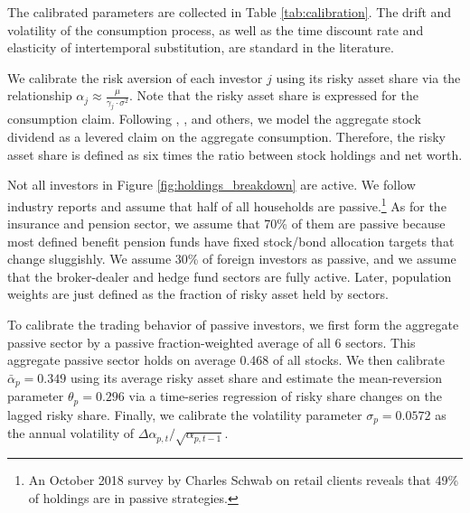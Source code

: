 \documentclass[12pt,english]{article}
\begin{document}
The calibrated parameters are collected in Table \ref{tab:calibration}. The drift and volatility of the consumption process, as well as the time discount rate and elasticity of intertemporal substitution, are standard in the literature. 

We calibrate the risk aversion of each investor $j$ using its risky asset share via the relationship $\alpha_j \approx \frac{\mu}{\gamma_j \cdot \sigma^2}$. Note that the risky asset share is expressed for the consumption claim. Following \citet{abel1999risk}, \citet{campbell2003consumption}, and others, we model the aggregate stock dividend as a levered claim on the aggregate consumption. Therefore, the risky asset share is defined as six times the ratio between stock holdings and net worth. 

Not all investors in Figure \ref{fig:holdings_breakdown} are active. We follow industry reports and assume that half of all households are passive.\footnote{An October 2018 survey by Charles Schwab on retail clients reveals that 49\% of holdings are in passive strategies.} As for the insurance and pension sector, we assume that 70\% of them are passive because most defined benefit pension funds have fixed stock/bond allocation targets that change sluggishly. We assume 30\% of foreign investors as passive, and we assume that the broker-dealer and hedge fund sectors are fully active. Later, population weights are just defined as the fraction of risky asset held by sectors. 

To calibrate the trading behavior of passive investors, we first form the aggregate passive sector by a passive fraction-weighted average of all 6 sectors. This aggregate passive sector holds on average 0.468 of all stocks. We then calibrate $\bar{\alpha}_p = 0.349$ using its average risky asset share and estimate the mean-reversion parameter $\theta_p = 0.296$ via a time-series regression of risky share changes on the lagged risky share. Finally, we calibrate the volatility parameter $\sigma_p = 0.0572$ as the annual volatility of $\Delta \alpha_{p,t}/\sqrt{\alpha_{p,t-1}}$. 

% 

\end{document}
